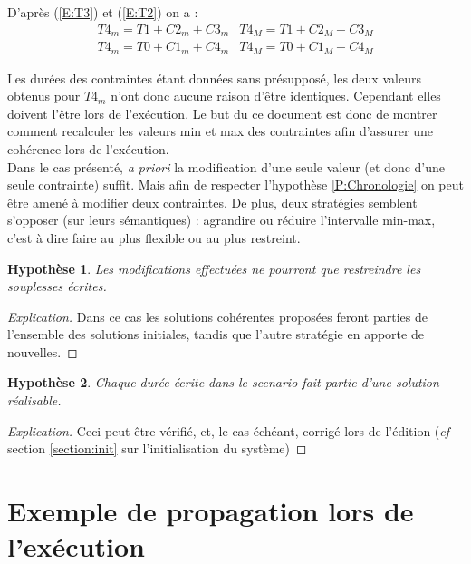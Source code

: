 \documentclass[10pt,a4paper]{article}
\newtheorem{presup}{Hypothèse}
\newcommand{\hyporef}[1]{l'hypothèse \ref{#1}}
\begin{document}
D'après (\ref{E:T3}) et (\ref{E:T2}) on a :
	\begin{eqnarray} 
		\label{E:conjonction}
		T4_m = T1 + C2_m + C3_m &
		T4_M = T1 + C2_M + C3_M \\
		T4_m = T0 + C1_m + C4_m &
		T4_M = T0 + C1_M + C4_M \nonumber
	\end{eqnarray}

Les durées des contraintes étant données sans présupposé, les deux valeurs obtenus pour $T4_m$ n'ont donc aucune raison d'être identiques. Cependant elles doivent l'être lors de l'exécution. Le but du ce document est donc de montrer comment recalculer les valeurs min et max des contraintes afin d'assurer une cohérence lors de l'exécution.\\

Dans le cas présenté, \textit{a priori} la modification d'une seule valeur (et donc d'une seule contrainte) suffit. Mais afin de respecter \hyporef{P:Chronologie} on peut être amené à modifier deux contraintes. De plus, deux stratégies semblent s'opposer (sur leurs sémantiques) : agrandire ou réduire l'intervalle min-max, c'est à dire faire au plus flexible ou au plus restreint.

	\begin{presup}
		Les modifications effectuées ne pourront que restreindre les souplesses écrites. \label{P:modif}
	\end{presup}
	\begin{proof}[Explication]
		Dans ce cas les solutions cohérentes proposées feront parties de l'ensemble des solutions initiales, tandis que l'autre stratégie en apporte de nouvelles.
	\end{proof}

	\begin{presup}
		Chaque durée écrite dans le scenario fait partie d'une solution réalisable. \label{P:coherent}
	\end{presup}
	\begin{proof}[Explication]
		Ceci peut être vérifié, et, le cas échéant, corrigé lors de l'édition (\textit{cf} section \ref{section:init} sur l'initialisation du système)
	\end{proof}


\section{Exemple de propagation lors de l'exécution}
\end{document}
